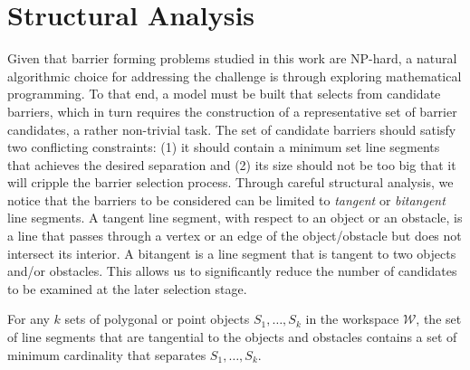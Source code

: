 
\section{Structural Analysis}
Given that barrier forming problems studied in this work are NP-hard, a natural algorithmic choice for addressing the challenge is through exploring  mathematical programming.
%
To that end, a model must be built that selects from candidate barriers, which in turn requires the construction of a representative set of barrier candidates, a rather non-trivial task. 
%
The set of candidate barriers should satisfy two conflicting constraints: (1) it should contain a minimum set line segments that achieves the desired separation and (2) its size should not be too big that it will cripple the barrier selection process. 
%
Through careful structural analysis, we notice that the barriers to be considered can be limited to \emph{tangent} or \emph{bitangent} line segments. A tangent line segment, with respect to an object or an obstacle, is a line that passes through a vertex or an edge of the object/obstacle but does not intersect its interior. A bitangent is a line segment that is tangent to two objects and/or obstacles. 
%
This allows us to significantly reduce the number of candidates to be examined at the later selection stage.

\begin{theorem}\label{theorem:sin_tan}
For any $k$ sets of polygonal or point objects $S_1, \dots, S_k$ in the workspace $\mathcal W$, the set of line segments that are tangential to the objects and obstacles contains a set of minimum cardinality that separates $S_1, \dots, S_k$. 
\end{theorem}


